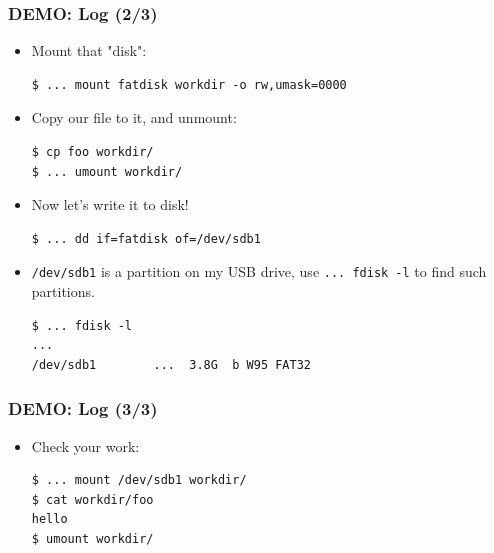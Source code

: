 \begin{frame}[fragile]

\frametitle{DEMO: Log (2/3)}

\begin{itemize}

\item Mount that "disk":

\begin{verbatim}
$ ... mount fatdisk workdir -o rw,umask=0000
\end{verbatim}

\item Copy our file to it, and unmount:

\begin{verbatim}
$ cp foo workdir/
$ ... umount workdir/
\end{verbatim}

\item Now let's write it to disk!

\begin{verbatim}
$ ... dd if=fatdisk of=/dev/sdb1
\end{verbatim}

\item \texttt{/dev/sdb1} is a partition on my USB drive, use \texttt{... fdisk
-l} to find such partitions.

\begin{verbatim}
$ ... fdisk -l
...
/dev/sdb1        ...  3.8G  b W95 FAT32
\end{verbatim}

\end{itemize}

\end{frame}


\begin{frame}[fragile]

\frametitle{DEMO: Log (3/3)}

\begin{itemize}

\item Check your work:

\begin{verbatim}
$ ... mount /dev/sdb1 workdir/
$ cat workdir/foo
hello
$ umount workdir/
\end{verbatim}

\end{itemize}

\end{frame}



